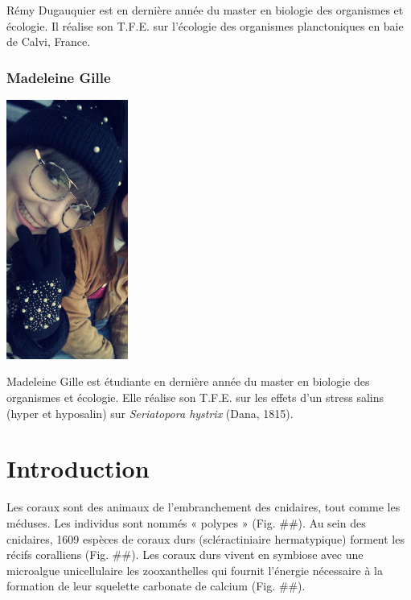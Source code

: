 \documentclass[]{report}
\begin{document}
Rémy Dugauquier est en dernière année du master en biologie des
organismes et écologie. Il réalise son T.F.E. sur l'écologie des
organismes planctoniques en baie de Calvi, France.

\subsection{Madeleine Gille}\label{madeleine-gille}

\includegraphics[width=4.00000cm]{../image/madeleine.jpg}

Madeleine Gille est étudiante en dernière année du master en biologie
des organismes et écologie. Elle réalise son T.F.E. sur les effets d'un
stress salins (hyper et hyposalin) sur \emph{Seriatopora hystrix} (Dana,
1815).

\chapter{Introduction}\label{introduction}

Les coraux sont des animaux de l'embranchement des cnidaires, tout comme
les méduses. Les individus sont nommés « polypes » (Fig. \#\#). Au sein
des cnidaires, 1609 espèces de coraux durs (scléractiniaire
hermatypique) forment les récifs coralliens (Fig. \#\#). Les coraux durs
vivent en symbiose avec une microalgue unicellulaire les zooxanthelles
qui fournit l'énergie nécessaire à la formation de leur squelette
carbonate de calcium (Fig. \#\#).
\end{document}
